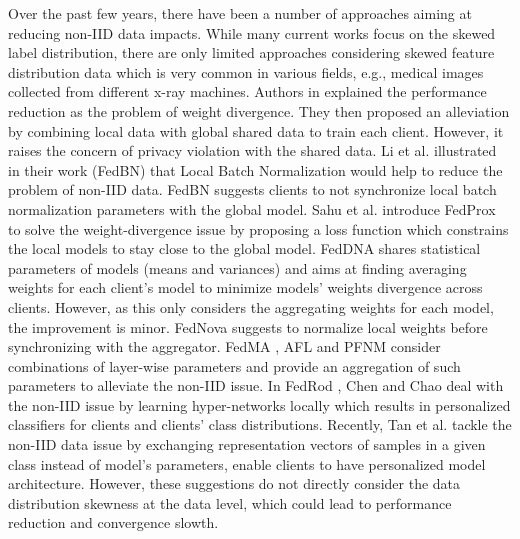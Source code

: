 \documentclass[mathfont=newtx]{uai2023} %
\begin{document}
Over the past few years, there have been a number of approaches aiming at reducing non-IID data impacts. While many current works focus on the skewed label distribution, there are only limited approaches considering skewed feature distribution data which is very common in various fields, e.g., medical images collected from different x-ray machines. Authors in \cite{Zhao2018FederatedLW} explained the performance reduction as the problem of weight divergence. They then proposed an alleviation by combining local data with global shared data to train each client. However, it raises the concern of privacy violation with the shared data. Li et al. illustrated in their work (FedBN) \cite{li2021fedbn} that Local Batch Normalization would help to reduce the problem of non-IID data. FedBN suggests clients to not synchronize local batch normalization parameters with the global model. Sahu et al. introduce FedProx \cite{FedProx} to solve the weight-divergence issue by proposing a loss function which constrains the local models to stay close to the global model. FedDNA \cite{fedDNA} shares statistical parameters of models (means and variances) and aims at finding averaging weights for each client's model to minimize models' weights divergence across clients. However, as this only considers the aggregating weights for each model, the improvement is minor. FedNova \cite{fednova} suggests to normalize local weights before synchronizing with the aggregator. FedMA \cite{fedma}, AFL \cite{AFL} and PFNM \cite{pfnm} consider combinations of layer-wise parameters and provide an aggregation of such parameters to alleviate the non-IID issue. In FedRod \cite{FedRod}, Chen and Chao deal with the non-IID issue by learning hyper-networks locally which results in personalized classifiers for clients and clients' class distributions. Recently, Tan et al. \cite{FedProto} tackle the non-IID data issue by exchanging representation vectors of samples in a given class instead of model's parameters, enable clients to have personalized model architecture. However, these suggestions do not directly consider the data distribution skewness at the data level, which could lead to performance reduction and convergence slowth.    
\end{document}
